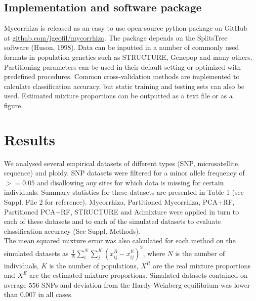 \documentclass[final]{bioinfo}
\begin{document}
\begin{methods}
\subsection{Implementation and software package}
Mycorrhiza is released as an easy to use open-source python package on GitHub at \underline{github.com/jgeofil/mycorrhiza}. The package depends on the SplitsTree software (Huson, 1998). Data can be inputted in a number of commonly used formats in population genetics such as STRUCTURE, Genepop and many others. Partitioning parameters can be used in their default setting or optimized with predefined procedures. Common cross-validation methods are implemented to calculate classification accuracy, but static training and testing sets can also be used. Estimated mixture proportions can be outputted as a text file or as a figure. 
\end{methods}
\section{Results}
We analysed several empirical datasets of different types (SNP, microsatellite, sequence) and ploidy. SNP datasets were filtered for a minor allele frequency of $>=0.05$ and disallowing any sites for which data is missing for certain individuals. Summary statistics for these datasets are presented in Table 1 (see Suppl. File 2 for reference). Mycorrhiza, Partitioned Mycorrhiza, PCA+RF, Partitioned PCA+RF, STRUCTURE and Admixture were applied in turn to each of these datasets and to each of the simulated datasets to evaluate classification accuracy (See Suppl. Methods).\\
The mean squared mixture error was also calculated for each method on the simulated datasets as $\frac{1}{N}\sum_{i}^{N}\sum_{j}^{K}(x_{ij}^{R} - x_{ij}^{E})^2$, where $N$ is the number of individuals, $K$ is the number of populations, $X^{R}$ are the real mixture proportions and $X^{E}$ are the estimated mixture proportions. Simulated datasets contained on average $556$ SNPs and deviation from the Hardy-Weinberg equilibrium was lower than $0.007$ in all cases. 
\end{document}
